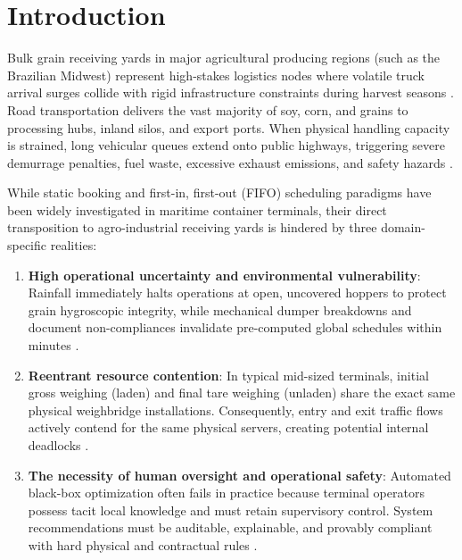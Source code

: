 \documentclass[11pt,a4paper]{article}
\begin{document}
\onehalfspacing

\section{Introduction}
\label{sec:introduction}

Bulk grain receiving yards in major agricultural producing regions (such as the Brazilian Midwest) represent high-stakes logistics nodes where volatile truck arrival surges collide with rigid infrastructure constraints during harvest seasons \parencite{abdelmagidComprehensiveReviewTruck2022a, graciaTruckAppointmentScheduling2025a}. Road transportation delivers the vast majority of soy, corn, and grains to processing hubs, inland silos, and export ports. When physical handling capacity is strained, long vehicular queues extend onto public highways, triggering severe demurrage penalties, fuel waste, excessive exhaust emissions, and safety hazards \parencite{fioroniFarmPortSimulation2015a, bouyahiaNovelTruckAppointment2025b}.

While static booking and first-in, first-out (FIFO) scheduling paradigms have been widely investigated in maritime container terminals, their direct transposition to agro-industrial receiving yards is hindered by three domain-specific realities:
\begin{enumerate}[leftmargin=1.2cm,itemsep=0pt,topsep=2pt]
  \item \textbf{High operational uncertainty and environmental vulnerability}: Rainfall immediately halts operations at open, uncovered hoppers to protect grain hygroscopic integrity, while mechanical dumper breakdowns and document non-compliances invalidate pre-computed global schedules within minutes \parencite{liProcessSchedulingUncertainty2008a, r.berrutoAnalyzingReceivingOperation2001a}.
  \item \textbf{Reentrant resource contention}: In typical mid-sized terminals, initial gross weighing (laden) and final tare weighing (unladen) share the exact same physical weighbridge installations. Consequently, entry and exit traffic flows actively contend for the same physical servers, creating potential internal deadlocks \parencite{gravesSchedulingReentrantFlow1983, ruizHybridFlowShop2010}.
  \item \textbf{The necessity of human oversight and operational safety}: Automated black-box optimization often fails in practice because terminal operators possess tacit local knowledge and must retain supervisory control. System recommendations must be auditable, explainable, and provably compliant with hard physical and contractual rules \parencite{vanderheydenDecisionSupportSystem1985a, mardanehDecisionSupportSystem2021a}.
\end{enumerate}
\end{document}

